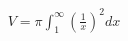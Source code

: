 \documentclass[preview]{standalone}
\begin{document}
\begin{align*}
V = \pi \int_1^{\infty} \left(\frac{1}{x}\right)^2 dx
\end{align*}
\end{document}
